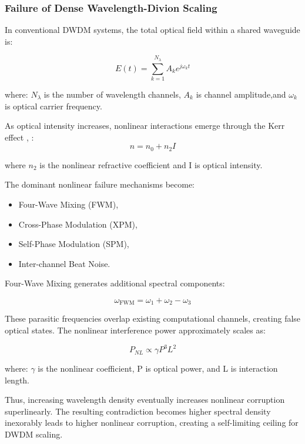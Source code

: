 \documentclass[journal]{IEEEtran}
\begin{document}
\subsubsection{\textbf{Failure of Dense Wavelength-Divion Scaling}}

In conventional DWDM systems, the total optical field within a shared waveguide is:

\begin{equation}
E(t) = \sum_{k=1}^{N_{\lambda}} A_k e^{j\omega_k t} 
\end{equation}

where: $N_{\lambda}$ is the number of wavelength channels, $A_k$ is channel amplitude,and $\omega_{k}$ is optical carrier frequency.

As optical intensity increases, nonlinear interactions emerge through the Kerr effect \cite{Saleh2019}, \cite{Boyd2020}:
\begin{equation}
n = n_0 + n_2I
\end{equation}

where $n_2$ is the nonlinear refractive coefficient and I is optical intensity.

The dominant nonlinear failure mechanisms become:
\begin{itemize}
\item Four-Wave Mixing (FWM),
\item Cross-Phase Modulation (XPM),
\item Self-Phase Modulation (SPM),
\item Inter-channel Beat Noise.
\end{itemize}

Four-Wave Mixing generates additional spectral components:

\begin{equation}
\omega_{\text{FWM}} = \omega_1 + \omega_2 - \omega_3 
\end{equation}

These parasitic frequencies overlap existing computational channels, creating false optical states. The nonlinear interference power approximately scales as:

\begin{equation}
P_{NL} \propto \gamma P^{3} L^{2}
\end{equation}

where: $\gamma$ is the nonlinear coefficient, P is optical power, and L is interaction length.

Thus, increasing wavelength density eventually increases nonlinear corruption superlinearly. The resulting contradiction becomes higher spectral density inexorably leads to higher nonlinear corruption, creating a self-limiting ceiling for DWDM scaling.
\end{document}
